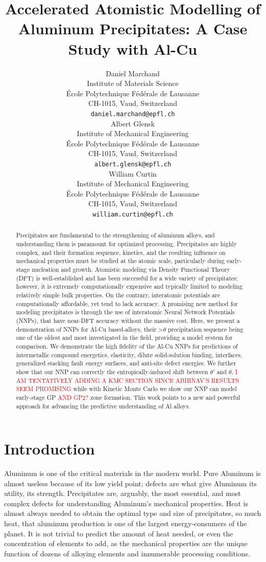 \documentclass{article}
\title{Accelerated Atomistic Modelling of Aluminum Precipitates: A Case Study with Al-Cu}
\author{
 Daniel Marchand \\
  Institute of Materials Science \\
  École Polytechnique Fédérale de Lausanne \\
  CH-1015, Vaud, Switzerland \\
  \texttt{daniel.marchand@epfl.ch} \\
   \And
 Albert Glensk \\
  Institute of Mechanical Engineering \\
  École Polytechnique Fédérale de Lausanne \\
  CH-1015, Vaud, Switzerland \\
  \texttt{albert.glensk@epfl.ch} \\
  \And
 William Curtin \\
  Institute of Mechanical Engineering \\
  École Polytechnique Fédérale de Lausanne \\
  CH-1015, Vaud, Switzerland \\
  \texttt{william.curtin@epfl.ch} \\
}
\begin{document}
\maketitle
\begin{abstract}
Precipitates are fundamental to the strengthening of aluminum alloys, and understanding them is paramount for optimized processing.
Precipitates are highly complex, and their formation sequence, kinetics, and the resulting influence on mechanical properties must be studied at the atomic scale, particularly during early-stage nucleation and growth.
Atomistic modeling via Density Functional Theory (DFT) is well-established and has been successful for a wide variety of precipitates; however, it is extremely computationally expensive and typically limited to modeling relatively simple bulk properties. On the contrary, interatomic potentials are computationally affordable, yet tend to lack accuracy. A promising new method for modeling precipitates is through the use of interatomic Neural Network Potentials (NNPs), that have near-DFT accuracy without the massive cost. 
Here, we present a demonstration of NNPs for Al-Cu based-alloys, their >$\theta$ precipitation sequence being one of the oldest and most investigated in the field, providing a model system for comparison.
We demonstrate the high fidelity of the Al-Cu NNPs for predictions of intermetallic compound energetics, elasticity, dilute solid-solution binding, interfaces, generalized stacking fault energy surfaces, and anti-site defect energies.
We further show that our NNP can correctly the entropically-induced shift between $\theta'$ and $\theta$, 
\textcolor{red}{I AM TENTATIVELY ADDING A KMC SECTION SINCE ABHINAV'S RESULTS SEEM PROMISING} while with Kinetic Monte Carlo we show our NNP can model early-stage GP \textcolor{red}{AND GP2?} zone formation.
This work points to a new and powerful approach for advancing the predictive understanding of Al alloys. 
\end{abstract}




\section{Introduction}
Aluminum is one of the critical materials in the modern world.
Pure Aluminum is almost useless because of its low yield point\cite{Nie2014PhysicalAlloys}; defects are what give Aluminum its utility, its strength.
Precipitates are, arguably, the most essential, and most complex defects for understanding Aluminum's mechanical properties.
Heat is almost always needed to obtain the optimal type and size of precipitates, so much heat, that aluminum production is one of the largest energy-consumers of the planet\cite{Raabe2019StrategiesMetals}.
It is not trivial to predict the amount of heat needed, or even the concentration of elements to add, as the mechanical properties are the unique function of dozens of alloying elements and innumerable processing conditions.
\end{document}
